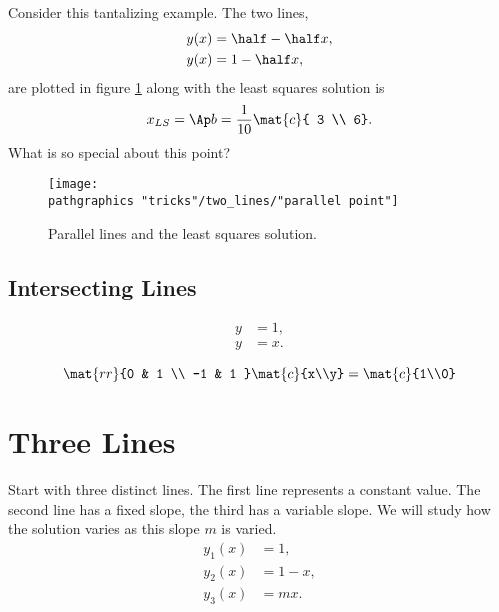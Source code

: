 Consider this tantalizing example. The two lines,
  \begin{equation*}   %
    \begin{split}
      y(x) &= \half - \half x, \\
      y(x) &= 1 - \half x,
    \end{split}
  \end{equation*}
are plotted in figure \ref{fig:tantalizing} along with the least squares solution is 
  \begin{equation*}   %
      x_{LS} = \Ap b = \frac{1}{10}\mat{c}{ 3 \\ 6}.
  \end{equation*}
What is so special about this point?
\begin{figure}[htbp] %
   \centering
     \texttt{[image: \\pathgraphics "tricks"/two\_lines/"parallel point"]} 
   \caption{Parallel lines and the least squares solution.}
   \label{fig:tantalizing}
\end{figure}

\subsection{Intersecting Lines}
  \begin{equation*}   %
   \begin{split}
      y &= 1, \\
      y &= x .
   \end{split}
  \end{equation*}

  \begin{equation*}   %
      \mat{rr}{0 & 1 \\ -1 & 1 }\mat{c}{x\\y} = \mat{c}{1\\0}
  \end{equation*}


\section{Three Lines}  %
Start with three distinct lines. The first line represents a constant value. The second line has a fixed slope, the third has a variable slope. We will study how the solution varies as this slope $m$ is varied.
  \begin{equation*}   %
     \begin{split}
       y_{1}(x) &= 1, \\
       y_{2}(x) &= 1 - x, \\
       y_{3}(x) &= m x.
     \end{split}
  \end{equation*}

